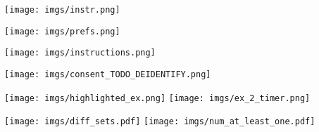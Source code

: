 \documentclass[11pt]{article}
\newcommand{\ant}{anthropomorphism\xspace}
\begin{document}
\begin{figure*}[th!]
    \centering
    
    \texttt{[image: imgs/instr.png]}
          
    \caption{Welcome page for annotation task on Prolific. }
    \label{fig:welcome}
\end{figure*}


\begin{figure*}[t]
\texttt{[image: imgs/prefs.png]}
\caption{Question about preferences at the end of the crowdsourcing task. }
    \label{fig:preference}
\end{figure*}

\begin{figure*}[th!]
    \centering

        \texttt{[image: imgs/instructions.png]}

    \caption{Instructions and examples available during the crowdsourcing task.}
    \label{fig:taskinstance2}
\end{figure*}

\begin{figure*}[th!]
    \centering
       

        \texttt{[image: imgs/consent\_TODO\_DEIDENTIFY.png]}

    \caption{Consent form provided to the annotators before beginning the crowdsourcing task.}
    \label{fig:consent}
\end{figure*}

\begin{figure*}[th!]
    \centering
    \texttt{[image: imgs/highlighted\_ex.png]}
     \texttt{[image: imgs/ex\_2\_timer.png]}
    \caption{Screenshot of the annotation task.}
    \label{fig:taskinstance3}
\end{figure*}


\begin{figure*}[t]
    \centering
    \texttt{[image: imgs/diff\_sets.pdf]}
    \texttt{[image: imgs/num\_at\_least\_one.pdf]}
    \caption{\textbf{Distribution of anthropomorphic behaviors identified by participants in our crowdsourcing study. } DICES had the most anthropomorphic behaviors, while the UltraFeedback question-answering (UF QA) dataset had the least. Nevertheless all datasets had substantial amounts of \ant, with $\sim80\%$ of all examples being labeled with at least one type of anthropomorphic behavior. UG and G stand for unguided and guided respectively. 
    }
    \label{fig:humanlike}
\end{figure*}
\end{document}
